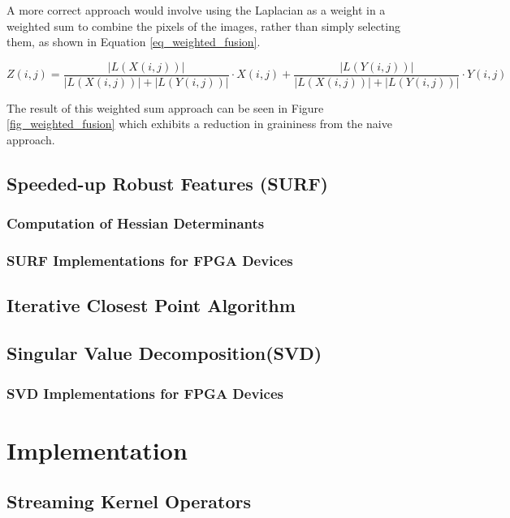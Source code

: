 \documentclass{article}
\begin{document}
A more correct approach would involve using the Laplacian as a weight in a weighted sum to combine the pixels of the images, rather than simply selecting them, as shown in Equation \ref{eq_weighted_fusion}.

\begin{equation}
Z(i,j) = \frac{|L(X(i,j))|}{|L(X(i,j))| + |L(Y(i,j))|} \cdot X(i,j) + \frac{|L(Y(i,j))|}{|L(X(i,j))| + |L(Y(i,j))|} \cdot Y(i,j)
\label{eq_weighted_fusion}
\end{equation}

The result of this weighted sum approach can be seen in Figure \ref{fig_weighted_fusion} which exhibits a reduction in graininess from the naive approach.

\subsection{Speeded-up Robust Features (SURF)}

\subsubsection{Computation of Hessian Determinants}

\subsubsection{SURF Implementations for FPGA Devices}

\subsection{Iterative Closest Point Algorithm}

\subsection{Singular Value Decomposition(SVD)}

\subsubsection{SVD Implementations for FPGA Devices}

\section{Implementation}

\subsection{Streaming Kernel Operators}
\end{document}

